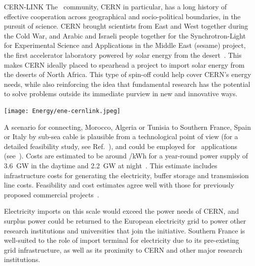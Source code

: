 \documentclass[../SustainableHEP.tex]{subfiles}
\begin{document}



\begin{casestudy}{CERN-LINK}%
The \ACR\ community, CERN in particular, has a long history of effective cooperation across geographical and socio-political boundaries, in the pursuit of science.  
CERN brought scientists from East and West together during the Cold War, and Arabic and Israeli people together for the  Synchrotron-Light for Experimental Science and Applications in the Middle East (\acrshort{sesame}) project, the first accelerator laboratory powered by solar energy from the desert~\cite{Sesame}. This makes CERN ideally placed to spearhead a project to import solar energy from the deserts of North Africa.  This type of spin-off could help cover CERN's energy needs, while also reinforcing the idea that fundamental research has the potential to solve problems outside its immediate purview in new and innovative ways.


\begin{center}
\captionsetup{type=figure}
     \texttt{[image: Energy/ene-cernlink.jpeg]}
     \caption[Map for CERN-LINK]{Potential CERN-LINK cable (in blue) connecting North African solar power plants with the European electricity grid. Also shown are existing power lines (purple, red, dashed blue), gas and oil pipelines (green/yellow) and PV plants (yellow/red dots). Base map taken from Ref.~\cite{OpenMap} and annotated.}
     \label{fig:ene-cernlink}
\end{center}


A scenario for connecting, \eg Morocco, Algeria or Tunisia to Southern France, Spain or Italy by sub-sea cable is plausible from a technological point of view (for a detailed feasibility study, see Ref.~\cite{MoroccoHVDV}), and could be employed for \ACR\ applications (see~). Costs are estimated to be around /kWh for a year-round power supply of 3.6~GW in the daytime and 2.2~GW at night~\cite{Dueren, Dueren+2011+263+275, Hampp}. This estimate includes infrastructure costs for generating the electricity, buffer storage and transmission line costs. Feasibility and cost estimates agree well with those for previously proposed commercial projects~\cite{Xlinks}.

Electricity imports on this scale would exceed the power needs of CERN, and surplus power could be returned to the European electricity grid to power other research institutions and universities that join the initiative. Southern France is well-suited to the role of import terminal for electricity due to its pre-existing grid infrastructure, as well as its proximity to CERN and other major research institutions. 


\end{casestudy}
\end{document}
